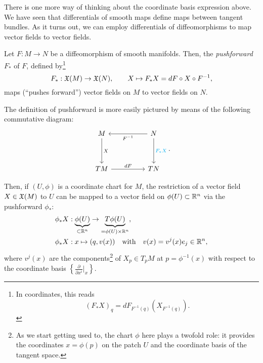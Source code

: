 There is one more way of thinking about the coordinate basis expression above.
We have seen that differentials of smooth maps define maps between tangent bundles.
As it turns out, we can employ differentials of diffeomorphisms to map vector fields to vector fields.

\begin{definition}
  Let $F:M\to N$ be a diffeomorphism of smooth manifolds.
  Then, the \emph{pushforward} $F_*$ of $F$, defined by\footnote{In coordinates, this reads\begin{equation}
      (F_* X)_q = dF_{F^{-1}(q)}(X_{F^{-1}(q)}).
    \end{equation}}
  \begin{equation}
    F_*: \mathfrak{X}(M) \to \mathfrak{X}(N),\qquad
    X \mapsto F_* X = d F \circ X \circ F^{-1},
  \end{equation}
  maps (``pushes forward'') vector fields on $M$ to vector fields on $N$.
\end{definition}

The definition of pushforward is more easily pictured by means of the following commutative diagram:
\begin{equation}
  \begin{tikzcd}[row sep=huge, column sep=huge]
    M \arrow[d, "X"]
    & N \arrow[l, "F^{-1}"] \arrow[d, "F_*X" cyan]\\
    TM \arrow[r, "d F"]
    & TN
  \end{tikzcd}.
\end{equation}

Then, if $(U, \phi)$ is a coordinate chart for $M$, the restriction of a vector field $X\in\mathfrak{X}(M)$ to $U$ can be mapped to a vector field on $\phi(U)\subset\mathbb{R}^n$ via the pushforward $\phi_*$:
\begin{align}
  \phi_* X & : \LaTeXunderbrace{\phi(U)}_{\subset\R^n} \to \LaTeXunderbrace{T \phi(U)}_{=\phi(U)\times\R^n}, \\
  \phi_* X & : x\mapsto (q,v(x)) \quad\mbox{with}\quad v(x) = v^j(x)e_j \in \R^n,
\end{align}
where $v^j(x)$ are the components\footnote{As we start getting used to, the chart $\phi$ here plays a twofold role: it provides the coordinates $x=\phi(p)$ on the patch $U$ and the coordinate basis of the tangent space.} of $X_p\in T_p M$ at $p=\phi^{-1}(x)$ with respect to the coordinate basis $\left\{\frac{\partial}{\partial x^i}\big|_x\right\}$.


